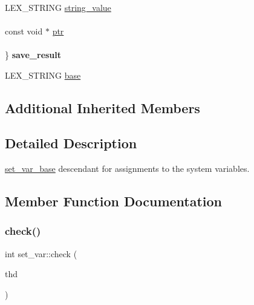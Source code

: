 \begin{DoxyCompactItemize}
\begin{tabbing}
\>\\
\>LEX\_STRING \mbox{\hyperlink{classset__var_acd8a16b9bf4d235ab59629f5f0f726f2}{string\_value}}\\
\>\\
\>const void $\ast$ \mbox{\hyperlink{classset__var_af62fe29177dec7226a820559e3ca2fd4}{ptr}}\\
\>\\
\} {\bfseries save\_result}\\

\end{tabbing}\item 
L\+E\+X\+\_\+\+S\+T\+R\+I\+NG \mbox{\hyperlink{classset__var_a8eeb18aa84a3652c4df76ce222e2a14c}{base}}
\end{DoxyCompactItemize}
\subsection*{Additional Inherited Members}


\subsection{Detailed Description}
\mbox{\hyperlink{classset__var__base}{set\+\_\+var\+\_\+base}} descendant for assignments to the system variables. 

\subsection{Member Function Documentation}
\mbox{\label{classset__var_a9d3bbbfa65cf51f9770ef2bd9c77ddcc}} 
\subsubsection{\texorpdfstring{check()}{check()}}
{\footnotesize\ttfamily int set\+\_\+var\+::check (\begin{DoxyParamCaption}\item[{T\+HD $\ast$}]{thd }\end{DoxyParamCaption})\hspace{0.3cm}{\ttfamily [virtual]}}

